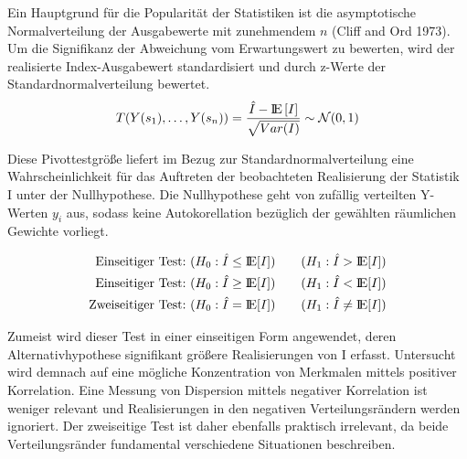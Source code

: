 Ein Hauptgrund für die Popularität der Statistiken ist die asymptotische Normalverteilung der Ausgabewerte mit zunehmendem $n$ (Cliff and Ord 1973). 
Um die Signifikanz der Abweichung vom Erwartungswert zu bewerten, wird der realisierte Index-Ausgabewert standardisiert und durch z-Werte der Standardnormalverteilung bewertet.
\begin{equation*}
    T (Y(s_1),\ldots,Y(s_n)) = \frac{ \hat{I}- {\rm I\!E} \left[ I \right] } {\sqrt{Var(I)}}  \sim \mathcal{N}(0,1)
\end{equation*}


%

Diese Pivottestgröße liefert im Bezug zur Standardnormalverteilung eine Wahrscheinlichkeit für das Auftreten 
der beobachteten Realisierung der Statistik I unter der Nullhypothese.
Die Nullhypothese geht von zufällig verteilten Y-Werten $y_i$ aus, sodass keine Autokorellation bezüglich der gewählten räumlichen Gewichte vorliegt.

\begin{eqnarray}
    \text{Einseitiger Test:}& ~ (H_0: \hat{I} \leq {\rm I\!E}[I] ) \quad & (H_1: \hat{I} > {\rm I\!E}[I] ) \\
    \text{Einseitiger Test:}& ~ (H_0: \hat{I} \geq {\rm I\!E}[I] ) \quad & (H_1: \hat{I} < {\rm I\!E}[I] ) \\
    \text{Zweiseitiger Test:}& ~ (H_0: \hat{I} = {\rm I\!E}[I] ) \quad & (H_1: \hat{I} \neq {\rm I\!E}[I])
\end{eqnarray}

Zumeist wird dieser Test in einer einseitigen Form angewendet, deren Alternativhypothese signifikant größere Realisierungen von I erfasst.
Untersucht wird demnach auf eine mögliche Konzentration von Merkmalen mittels positiver Korrelation. 
Eine Messung von Dispersion mittels negativer Korrelation ist weniger relevant und Realisierungen in den negativen Verteilungsrändern werden ignoriert.
Der zweiseitige Test ist daher ebenfalls praktisch irrelevant, da beide Verteilungsränder fundamental verschiedene Situationen beschreiben. \cite[S.26]{goodchild_spatial_1986}

